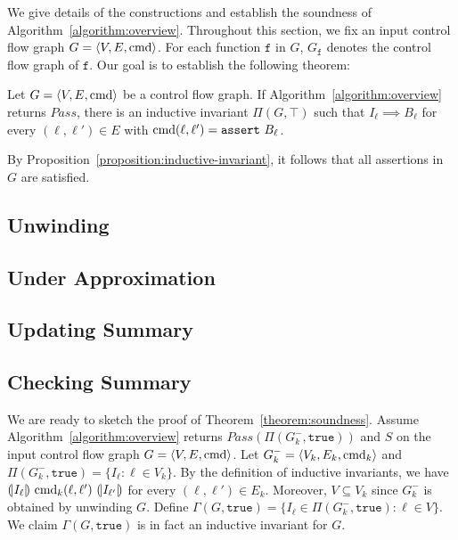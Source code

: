 
We give details of the constructions and establish the soundness of
Algorithm~\ref{algorithm:overview}. Throughout this section, we fix an
input control flow graph $G = \langle V, E, \textmd{cmd} \rangle$. For
each function $\mathtt{f}$ in $G$, $G_{\mathtt{f}}$ denotes the
control flow graph of $\mathtt{f}$. Our goal is to establish the
following theorem:

\begin{theorem}
  Let $G = \langle V, E, \textmd{cmd} \rangle$ be a control flow
  graph. If Algorithm~\ref{algorithm:overview} returns
  $\mathit{Pass}$, there is an inductive invariant $\Pi (G, \top)$
  such that $I_{\ell} \implies B_{\ell}$ for every $(\ell, \ell') \in
  E$ with $\textmd{cmd} (\ell, \ell') = \mathtt{assert\ } B_{\ell}$.
  \label{theorem:soundness}
\end{theorem}

By Proposition~\ref{proposition:inductive-invariant}, it follows that
all assertions in $G$ are satisfied.

\subsection{Unwinding}
\label{subsection:unwinding}


\subsection{Under Approximation}
\label{subsection:under-approximation}


\subsection{Updating Summary}
\label{subsection:updating-summary}


\subsection{Checking Summary}
\label{subsection:checking-summary}


We are ready to sketch the proof of Theorem~\ref{theorem:soundness}. 
Assume Algorithm~\ref{algorithm:overview} returns $\mathit{Pass} (\Pi
(G^-_k, \mathtt{true}))$ and $S$ on the input control flow graph $G =
\langle V, E, \textmd{cmd} \rangle$. Let $G^-_k = \langle V_k, E_k,
\textmd{cmd}_k \rangle$ and $\Pi (G^-_k, \mathtt{true}) = \{ I_{\ell}
: \ell \in V_k \}$. By the definition of inductive invariants, we have
$\assert{I_{\ell}}\ \textmd{cmd}_k (\ell, \ell')\ \assert{I_{\ell'}}$
for every $(\ell, \ell') \in E_k$. Moreover, $V \subseteq V_k$ since
$G^-_k$ is obtained by unwinding $G$. Define 
$\Gamma (G, \mathtt{true}) = \{ I_{\ell} \in \Pi (G^-_k,
\mathtt{true}) : \ell \in V \}$. We claim $\Gamma (G, \mathtt{true})$
is in fact an inductive invariant for $G$. 

